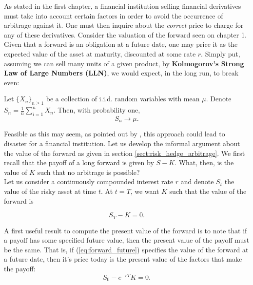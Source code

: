 \documentclass[../TGMAFFIRO.tex]{subfiles}
\begin{document}
As stated in the first chapter, a financial institution selling financial derivatives must take into account certain factors in order to avoid the occurrence of arbitrage against it. One must then inquire about the \textit{correct} price to charge for any of these derivatives. Consider the valuation of the forward seen on chapter 1. Given that a forward is an obligation at a future date, one may price it as the expected value of the asset at maturity, discounted at some rate $r$. Simply put, assuming we can sell many units of a given product, by \textbf{Kolmogorov's Strong Law of Large Numbers (LLN)}, we would expect, in the long run, to break even:

\begin{theorem}
    Let $\{X_n\}_{n\geq 1}$ be a collection of i.i.d. random variables with mean $\mu$. Denote $S_n = \frac{1}{n}\sum_{i=1}^n X_n$. Then, with probability one,
    \begin{equation}
        S_n \to \mu.
    \end{equation}
\end{theorem}

Feasible as this may seem, as pointed out by , this approach could lead to disaster for a financial institution. Let us develop the informal argument about the value of the forward as given in section \ref{sect:risk_hedge_arbitrage}. We first recall that the payoff of a long forward is given by $S - K$. What, then, is the value of $K$ such that no arbitrage is possible?\\

Let us consider a continuously compounded interest rate $r$ and denote $S_t$ the value of the risky asset at time $t$. At $t=T$, we want $K$ such that the value of the forward is

\begin{equation}\label{eq:forward_future}
  S_T - K = 0.
\end{equation}

A first useful result to compute the present value of the forward is to note that if a payoff has some specified future value, then the present value of the payoff must be the same. That is,
if (\ref{eq:forward_future}) specifies the value of the forward at a future date, then it's price today is the present value of the factors that make the payoff:
\begin{equation}
  S_0 - e^{-rT}K = 0.
\end{equation}
\end{document}

